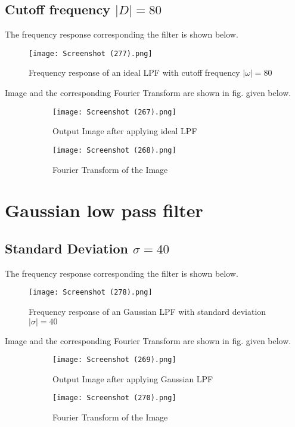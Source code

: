 \documentclass[12pt, a4paper]{article}
\begin{document}
\subsection{Cutoff frequency $|D|=80$}
The frequency response corresponding the filter is shown below.
\begin{figure}[h!]
  \centering
    \texttt{[image: Screenshot (277).png]}
    \caption{Frequency response of an ideal LPF with cutoff frequency $|\omega|=80$}
  \label{fig:4}
\end{figure}

\clearpage

Image and the corresponding Fourier Transform are shown in fig. given below.
\begin{figure}[H]
  \centering
  \begin{subfigure}[b]{0.45\linewidth}
    \texttt{[image: Screenshot (267).png]}
    \caption{Output Image after applying ideal LPF}
  \end{subfigure}
  \begin{subfigure}[b]{0.45\linewidth}
    \texttt{[image: Screenshot (268).png]}
    \caption{Fourier Transform of the Image}
  \end{subfigure}
  \caption{}
  \label{fig:5}
\end{figure}

\section{Gaussian low pass filter}
\subsection{Standard Deviation $\sigma=40$}
The frequency response corresponding the filter is shown below.
\begin{figure}[h!]
  \centering
    \texttt{[image: Screenshot (278).png]}
    \caption{Frequency response of an Gaussian LPF with standard deviation $|\sigma|=40$}
  \label{fig:6}
\end{figure}

\clearpage

Image and the corresponding Fourier Transform are shown in fig. given below.
\begin{figure}[H]
  \centering
  \begin{subfigure}[b]{0.45\linewidth}
    \texttt{[image: Screenshot (269).png]}
    \caption{Output Image after applying Gaussian LPF}
  \end{subfigure}
  \begin{subfigure}[b]{0.45\linewidth}
    \texttt{[image: Screenshot (270).png]}
    \caption{Fourier Transform of the Image}
  \end{subfigure}
  \caption{}
  \label{fig:7}
\end{figure}
\end{document}
